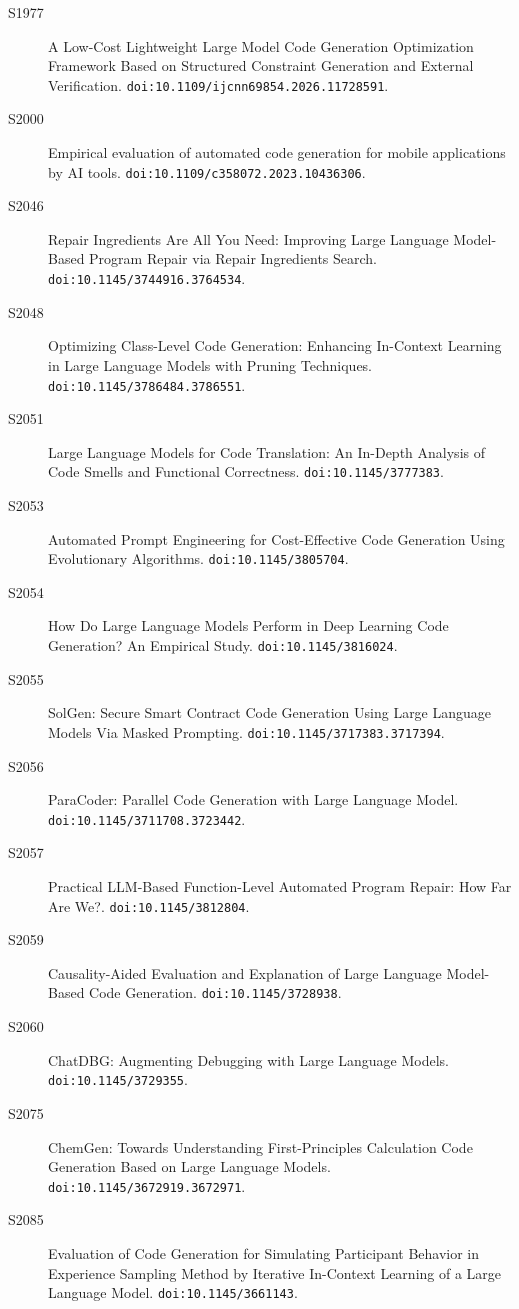 {\begin{description}
\item[S1977] A Low-Cost Lightweight Large Model Code Generation Optimization Framework Based on Structured Constraint Generation and External Verification. \texttt{doi:10.1109/ijcnn69854.2026.11728591}.
\item[S2000] Empirical evaluation of automated code generation for mobile applications by AI tools. \texttt{doi:10.1109/c358072.2023.10436306}.
\item[S2046] Repair Ingredients Are All You Need: Improving Large Language Model-Based Program Repair via Repair Ingredients Search. \texttt{doi:10.1145/3744916.3764534}.
\item[S2048] Optimizing Class-Level Code Generation: Enhancing In-Context Learning in Large Language Models with Pruning Techniques. \texttt{doi:10.1145/3786484.3786551}.
\item[S2051] Large Language Models for Code Translation: An In-Depth Analysis of Code Smells and Functional Correctness. \texttt{doi:10.1145/3777383}.
\item[S2053] Automated Prompt Engineering for Cost-Effective Code Generation Using Evolutionary Algorithms. \texttt{doi:10.1145/3805704}.
\item[S2054] How Do Large Language Models Perform in Deep Learning Code Generation? An Empirical Study. \texttt{doi:10.1145/3816024}.
\item[S2055] SolGen: Secure Smart Contract Code Generation Using Large Language Models Via Masked Prompting. \texttt{doi:10.1145/3717383.3717394}.
\item[S2056] ParaCoder: Parallel Code Generation with Large Language Model. \texttt{doi:10.1145/3711708.3723442}.
\item[S2057] Practical LLM-Based Function-Level Automated Program Repair: How Far Are We?. \texttt{doi:10.1145/3812804}.
\item[S2059] Causality-Aided Evaluation and Explanation of Large Language Model-Based Code Generation. \texttt{doi:10.1145/3728938}.
\item[S2060] ChatDBG: Augmenting Debugging with Large Language Models. \texttt{doi:10.1145/3729355}.
\item[S2075] ChemGen: Towards Understanding First-Principles Calculation Code Generation Based on Large Language Models. \texttt{doi:10.1145/3672919.3672971}.
\item[S2085] Evaluation of Code Generation for Simulating Participant Behavior in Experience Sampling Method by Iterative In-Context Learning of a Large Language Model. \texttt{doi:10.1145/3661143}.

\end{description}}
